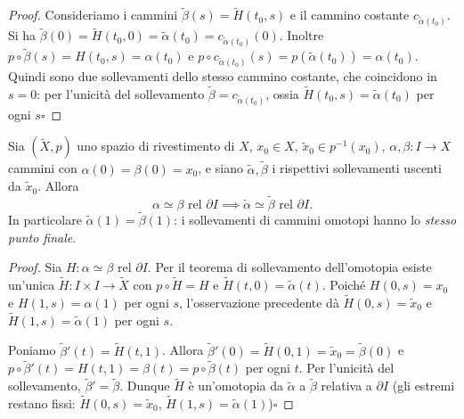 \begin{proof}
Consideriamo i cammini $\widetilde{\beta}(s) = \widetilde{H}(t_0, s)$ e il cammino costante $c_{\widetilde{\alpha}(t_0)}$. Si ha $\widetilde{\beta}(0) = \widetilde{H}(t_0, 0) = \widetilde{\alpha}(t_0) = c_{\widetilde{\alpha}(t_0)}(0)$. Inoltre $p \circ \widetilde{\beta}(s) = H(t_0, s) = \alpha(t_0)$ e $p \circ c_{\widetilde{\alpha}(t_0)}(s) = p(\widetilde{\alpha}(t_0)) = \alpha(t_0)$. Quindi sono due sollevamenti dello stesso cammino costante, che coincidono in $s = 0$: per l'unicit\`a del sollevamento $\widetilde{\beta} = c_{\widetilde{\alpha}(t_0)}$, ossia $\widetilde{H}(t_0, s) = \widetilde{\alpha}(t_0)$ per ogni $s$\hfill$\square$
\end{proof}

\begin{prop}
Sia $(\widetilde{X}, p)$ uno spazio di rivestimento di $X$, $x_0 \in X$, $\widetilde{x}_0 \in p^{-1}(x_0)$, $\alpha, \beta: I \to X$ cammini con $\alpha(0) = \beta(0) = x_0$, e siano $\widetilde{\alpha}, \widetilde{\beta}$ i rispettivi sollevamenti uscenti da $\widetilde{x}_0$. Allora
\[
\alpha \simeq \beta \text{ rel } \partial I \implies \widetilde{\alpha} \simeq \widetilde{\beta} \text{ rel } \partial I .
\]
In particolare $\widetilde{\alpha}(1) = \widetilde{\beta}(1)$: i sollevamenti di cammini omotopi hanno lo \emph{stesso punto finale}.
\end{prop}

\begin{proof}
Sia $H: \alpha \simeq \beta \text{ rel } \partial I$. Per il teorema di sollevamento dell'omotopia esiste un'unica $\widetilde{H}: I \times I \to \widetilde{X}$ con $p \circ \widetilde{H} = H$ e $\widetilde{H}(t,0) = \widetilde{\alpha}(t)$. Poich\'e $H(0,s) = x_0$ e $H(1,s) = \alpha(1)$ per ogni $s$, l'osservazione precedente d\`a $\widetilde{H}(0,s) = \widetilde{x}_0$ e $\widetilde{H}(1,s) = \widetilde{\alpha}(1)$ per ogni $s$.

Poniamo $\widetilde{\beta}'(t) = \widetilde{H}(t,1)$. Allora $\widetilde{\beta}'(0) = \widetilde{H}(0,1) = \widetilde{x}_0 = \widetilde{\beta}(0)$ e $p \circ \widetilde{\beta}'(t) = H(t,1) = \beta(t) = p \circ \widetilde{\beta}(t)$ per ogni $t$. Per l'unicit\`a del sollevamento, $\widetilde{\beta}' = \widetilde{\beta}$. Dunque $\widetilde{H}$ \`e un'omotopia da $\widetilde{\alpha}$ a $\widetilde{\beta}$ relativa a $\partial I$ (gli estremi restano fissi: $\widetilde{H}(0,s) = \widetilde{x}_0$, $\widetilde{H}(1,s) = \widetilde{\alpha}(1)$)\hfill$\square$
\end{proof}


